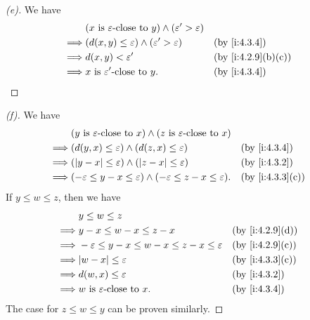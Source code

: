 \begin{proof}[(e)]
  We have
  \begin{align*}
             & (x \text{ is \(\varepsilon\)-close to } y) \land (\varepsilon' > \varepsilon)                        \\
    \implies & \pa{d(x, y) \leq \varepsilon} \land (\varepsilon' > \varepsilon)              &  & \by{i:4.3.4}      \\
    \implies & d(x, y) < \varepsilon'                                                        &  & \by{i:4.2.9}[b,c] \\
    \implies & x \text{ is \(\varepsilon'\)-close to } y.                                    &  & \by{i:4.3.4}
  \end{align*}
\end{proof}

\begin{proof}[(f)]
  We have
  \begin{align*}
             & (y \text{ is } \varepsilon\text{-close to } x) \land (z \text{ is } \varepsilon\text{-close to } x)                      \\
    \implies & \pa{d(y, x) \leq \varepsilon} \land \pa{d(z, x) \leq \varepsilon}                                   &  & \by{i:4.3.4}    \\
    \implies & (\abs{y - x} \leq \varepsilon) \land (\abs{z - x} \leq \varepsilon)                                 &  & \by{i:4.3.2}    \\
    \implies & (-\varepsilon \leq y - x \leq \varepsilon) \land (-\varepsilon \leq z - x \leq \varepsilon).        &  & \by{i:4.3.3}[c]
  \end{align*}
  If \(y \leq w \leq z\), then we have
  \begin{align*}
             & y \leq w \leq z                                                                     \\
    \implies & y - x \leq w - x \leq z - x                                    &  & \by{i:4.2.9}[d] \\
    \implies & -\varepsilon \leq y - x \leq w - x \leq z - x \leq \varepsilon &  & \by{i:4.2.9}[c] \\
    \implies & \abs{w - x} \leq \varepsilon                                   &  & \by{i:4.3.3}[c] \\
    \implies & d(w, x) \leq \varepsilon                                       &  & \by{i:4.3.2}    \\
    \implies & w \text{ is } \varepsilon\text{-close to } x.                  &  & \by{i:4.3.4}
  \end{align*}
  The case for \(z \leq w \leq y\) can be proven similarly.
\end{proof}

